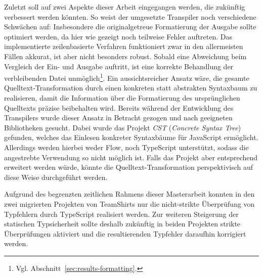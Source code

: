 Zuletzt soll auf zwei Aspekte dieser Arbeit eingegangen werden, die zukünftig verbessert werden könnten. So weist der umgesetzte Transpiler noch verschiedene Schwächen auf: Insbesondere die originalgetreue Formatierung der Ausgabe sollte optimiert werden, da hier wie gezeigt noch teilweise Fehler auftreten. Das implementierte zeilenbasierte Verfahren funktioniert zwar in den allermeisten Fällen akkurat, ist aber nicht besonders robust. Sobald eine Abweichung beim Vergleich der Ein- und Ausgabe auftritt, ist eine korrekte Behandlung der verbleibenden Datei unmöglich\footnote{Vgl. Abschnitt~\ref{sec:results-formatting}.}. Ein aussichtsreicher Ansatz wäre, die gesamte Quelltext-Transformation durch einen konkreten statt abstrakten Syntaxbaum zu realisieren, damit die Information über die Formatierung des ursprünglichen Quelltexts präzise beibehalten wird. Bereits während der Entwicklung des Transpilers wurde dieser Ansatz in Betracht gezogen und nach geeigneten Bibliotheken gesucht. Dabei wurde das Projekt \textit{CST} (\textit{Concrete Syntax Tree})~\autocite{SOFTWARE:CST} gefunden, welches das Einlesen konkreter Syntaxbäume für JavaScript ermöglicht. Allerdings werden hierbei weder Flow, noch TypeScript unterstützt, sodass die angestrebte Verwendung so nicht möglich ist. Falls das Projekt aber entsprechend erweitert werden würde, könnte die Quelltext-Transformation perspektivisch auf diese Weise durchgeführt werden.

Aufgrund des begrenzten zeitlichen Rahmens dieser Masterarbeit konnten in den zwei migrierten Projekten von TeamShirts nur die nicht-strikte Überprüfung von Typfehlern durch TypeScript realisiert werden. Zur weiteren Steigerung der statischen Typsicherheit sollte deshalb zukünftig in beiden Projekten strikte Überprüfungen aktiviert und die resultierenden Typfehler daraufhin korrigiert werden.
